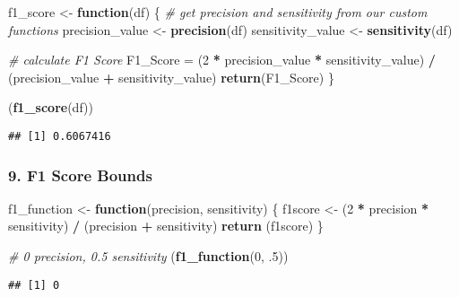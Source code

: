 \documentclass[
]{article}
\newenvironment{Shaded}{\begin{snugshade}}{\end{snugshade}}
\newcommand{\CommentTok}[1]{\textcolor[rgb]{0.56,0.35,0.01}{\textit{#1}}}
\newcommand{\ControlFlowTok}[1]{\textcolor[rgb]{0.13,0.29,0.53}{\textbf{#1}}}
\newcommand{\DecValTok}[1]{\textcolor[rgb]{0.00,0.00,0.81}{#1}}
\newcommand{\FloatTok}[1]{\textcolor[rgb]{0.00,0.00,0.81}{#1}}
\newcommand{\KeywordTok}[1]{\textcolor[rgb]{0.13,0.29,0.53}{\textbf{#1}}}
\newcommand{\NormalTok}[1]{#1}
\newcommand{\OperatorTok}[1]{\textcolor[rgb]{0.81,0.36,0.00}{\textbf{#1}}}
\newcommand{\StringTok}[1]{\textcolor[rgb]{0.31,0.60,0.02}{#1}}
\begin{document}
\begin{Shaded}
\begin{Highlighting}[]
\NormalTok{f1_score <-}\StringTok{ }\ControlFlowTok{function}\NormalTok{(df) \{}
  \CommentTok{# get precision and sensitivity from our custom functions}
\NormalTok{  precision_value <-}\StringTok{ }\KeywordTok{precision}\NormalTok{(df)}
\NormalTok{  sensitivity_value <-}\StringTok{ }\KeywordTok{sensitivity}\NormalTok{(df)}
  
  \CommentTok{# calculate F1 Score}
\NormalTok{  F1_Score =}\StringTok{ }\NormalTok{(}\DecValTok{2} \OperatorTok{*}\StringTok{ }\NormalTok{precision_value }\OperatorTok{*}\StringTok{ }\NormalTok{sensitivity_value) }\OperatorTok{/}\StringTok{ }\NormalTok{(precision_value }\OperatorTok{+}\StringTok{ }\NormalTok{sensitivity_value)}
  \KeywordTok{return}\NormalTok{(F1_Score)}
\NormalTok{\}}

\NormalTok{(}\KeywordTok{f1_score}\NormalTok{(df))}
\end{Highlighting}
\end{Shaded}

\begin{verbatim}
## [1] 0.6067416
\end{verbatim}

\hypertarget{f1-score-bounds}{%
\subsubsection{9. F1 Score Bounds}\label{f1-score-bounds}}

\begin{Shaded}
\begin{Highlighting}[]
\NormalTok{f1_function <-}\StringTok{ }\ControlFlowTok{function}\NormalTok{(precision, sensitivity) \{}
\NormalTok{  f1score <-}\StringTok{ }\NormalTok{(}\DecValTok{2} \OperatorTok{*}\StringTok{ }\NormalTok{precision }\OperatorTok{*}\StringTok{ }\NormalTok{sensitivity) }\OperatorTok{/}\StringTok{ }\NormalTok{(precision }\OperatorTok{+}\StringTok{ }\NormalTok{sensitivity)}
  \KeywordTok{return}\NormalTok{ (f1score)}
\NormalTok{\}}

\CommentTok{# 0 precision, 0.5 sensitivity}
\NormalTok{(}\KeywordTok{f1_function}\NormalTok{(}\DecValTok{0}\NormalTok{, }\FloatTok{.5}\NormalTok{))}
\end{Highlighting}
\end{Shaded}

\begin{verbatim}
## [1] 0
\end{verbatim}
\end{document}
